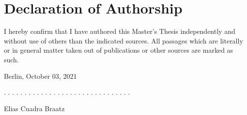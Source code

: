 \documentclass[a4paper,11pt]{article}
\newcommand{\thesistype}{Master's Thesis}
\newcommand{\thesisauthor}{Elias Cuadra Braatz}
\newcommand{\thesisdate}{October 03, 2021}
\begin{document}




\newpage
\thispagestyle{empty}
\hypertarget{declaration-of-authorship}{%
\section*{Declaration of Authorship}\label{declaration-of-authorship}}

I hereby confirm that I have authored this \thesistype{} independently and
without use of others than the indicated sources. All passages which are
literally or in general matter taken out of publications or other sources are
marked as such.
\vspace{1cm}

Berlin, \thesisdate{}
\vspace{3cm}

. . . . . . . . . . . . . . . . . . . . . . . . . . . . . . .
\vspace{0.1cm}

\thesisauthor{}
\end{document}
